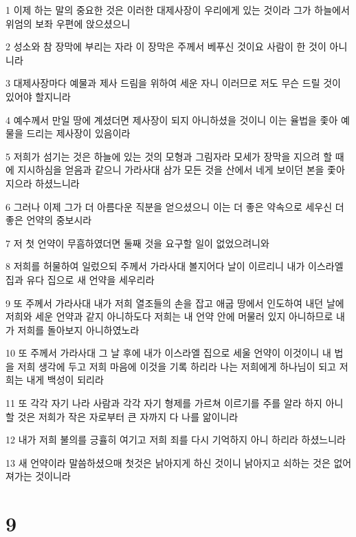 \par 1 이제 하는 말의 중요한 것은 이러한 대제사장이 우리에게 있는 것이라 그가 하늘에서 위엄의 보좌 우편에 앉으셨으니
\par 2 성소와 참 장막에 부리는 자라 이 장막은 주께서 베푸신 것이요 사람이 한 것이 아니니라
\par 3 대제사장마다 예물과 제사 드림을 위하여 세운 자니 이러므로 저도 무슨 드릴 것이 있어야 할지니라
\par 4 예수께서 만일 땅에 계셨더면 제사장이 되지 아니하셨을 것이니 이는 율법을 좇아 예물을 드리는 제사장이 있음이라
\par 5 저희가 섬기는 것은 하늘에 있는 것의 모형과 그림자라 모세가 장막을 지으려 할 때에 지시하심을 얻음과 같으니 가라사대 삼가 모든 것을 산에서 네게 보이던 본을 좇아 지으라 하셨느니라
\par 6 그러나 이제 그가 더 아름다운 직분을 얻으셨으니 이는 더 좋은 약속으로 세우신 더 좋은 언약의 중보시라
\par 7 저 첫 언약이 무흠하였더면 둘째 것을 요구할 일이 없었으려니와
\par 8 저희를 허물하여 일렀으되 주께서 가라사대 볼지어다 날이 이르리니 내가 이스라엘 집과 유다 집으로 새 언약을 세우리라
\par 9 또 주께서 가라사대 내가 저희 열조들의 손을 잡고 애굽 땅에서 인도하여 내던 날에 저희와 세운 언약과 같지 아니하도다 저희는 내 언약 안에 머물러 있지 아니하므로 내가 저희를 돌아보지 아니하였노라
\par 10 또 주께서 가라사대 그 날 후에 내가 이스라엘 집으로 세울 언약이 이것이니 내 법을 저희 생각에 두고 저희 마음에 이것을 기록 하리라 나는 저희에게 하나님이 되고 저희는 내게 백성이 되리라
\par 11 또 각각 자기 나라 사람과 각각 자기 형제를 가르쳐 이르기를 주를 알라 하지 아니할 것은 저희가 작은 자로부터 큰 자까지 다 나를 앎이니라
\par 12 내가 저희 불의를 긍휼히 여기고 저희 죄를 다시 기억하지 아니 하리라 하셨느니라
\par 13 새 언약이라 말씀하셨으매 첫것은 낡아지게 하신 것이니 낡아지고 쇠하는 것은 없어져가는 것이니라

\chapter{9}


